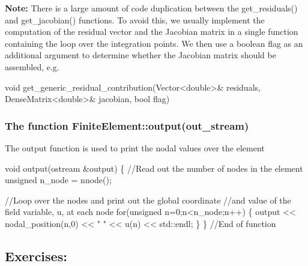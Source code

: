 {\bfseries Note\+:} There is a large amount of code duplication between the {\ttfamily get\+\_\+residuals()} and {\ttfamily get\+\_\+jacobian()} functions. To avoid this, we usually implement the computation of the residual vector and the Jacobian matrix in a single function containing the loop over the integration points. We then use a boolean flag as an additional argument to determine whether the Jacobian matrix should be assembled, e.\+g. 
\begin{DoxyCode}
\textcolor{keywordtype}{void} get\_generic\_residual\_contribution(Vector<double>& residuals,
                                       DenseMatrix<double>& jacobian,
                                       \textcolor{keywordtype}{bool} flag)         
\end{DoxyCode}
\hypertarget{index_FEout}{}\subsubsection{The function Finite\+Element\+::output(out\+\_\+stream)}\label{index_FEout}
The output function is used to print the nodal values over the element 
\begin{DoxyCodeInclude}
  \textcolor{keywordtype}{void} output(ostream &output) 
   \{
    \textcolor{comment}{//Read out the number of nodes in the element   }
    \textcolor{keywordtype}{unsigned} n\_node = nnode();

    \textcolor{comment}{//Loop over the nodes and print out the global coordinate }
    \textcolor{comment}{//and value of the field variable, u, at each node}
    \textcolor{keywordflow}{for}(\textcolor{keywordtype}{unsigned} n=0;n<n\_node;n++)
     \{
      output << nodal\_position(n,0) << \textcolor{stringliteral}{" "} << u(n) << std::endl;
     \}
   \} \textcolor{comment}{//End of function}

\end{DoxyCodeInclude}




 \hypertarget{index_FE_exercise}{}\subsection{Exercises\+:}\label{index_FE_exercise}

